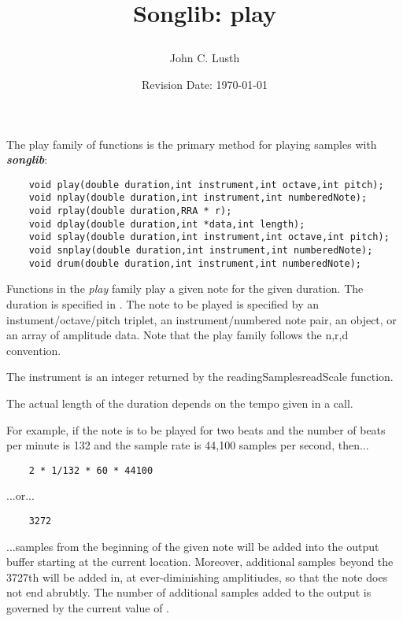 \documentclass{article}
\title{Songlib: play\\
\date{Revision Date: \today}}
\author{John C. Lusth}
\begin{document}
\maketitle

\W\subsubsection*{}
\W\htmlrule

The play family of functions is the primary method for playing
samples with {\it\bf songlib}:

\begin{verbatim}
    void play(double duration,int instrument,int octave,int pitch);
    void nplay(double duration,int instrument,int numberedNote);
    void rplay(double duration,RRA * r);
    void dplay(double duration,int *data,int length);
    void splay(double duration,int instrument,int octave,int pitch);
    void snplay(double duration,int instrument,int numberedNote);
    void drum(double duration,int instrument,int numberedNote);
\end{verbatim}

Functions in the
{\it play} family play a given note for the given duration. The duration
is specified in .
The note to be played is specified by
an instument/octave/pitch triplet, an instrument/numbered note pair,
an  object, or an array of amplitude data.
Note that the play family follows the {n,r,d} convention.

The instrument is an integer returned by the \seed
{readingSamples}{readScale} function.

The actual length of the duration depends on the tempo given
in a  call.

For example, if the note is to be played for two beats and
the number of beats per minute is 132 and the sample rate
is 44,100 samples per second, then...

\begin{verbatim}
    2 * 1/132 * 60 * 44100
\end{verbatim}

...or...

\begin{verbatim}
    3272
\end{verbatim}

...samples from the beginning of the given note
will be added into the output buffer starting
at the current location. Moreover, additional
samples beyond the 3727th will be added in,
at ever-diminishing amplitiudes, so that
the note does not end abrubtly.
The number of additional
samples added to the output is governed by
the current value of .
\end{document}
